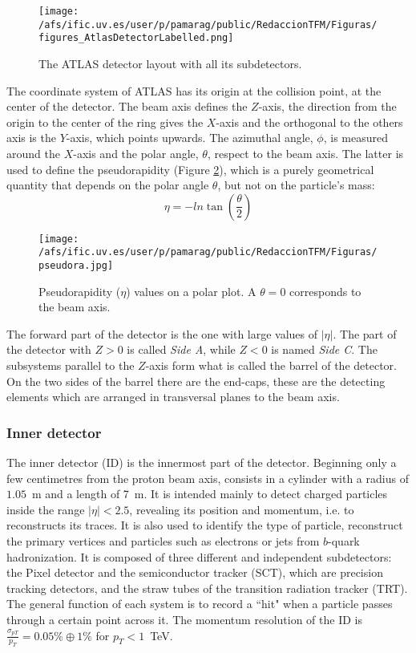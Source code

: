 \begin{figure}[htb]
\centering
\texttt{[image: /afs/ific.uv.es/user/p/pamarag/public/RedaccionTFM/Figuras/figures\_AtlasDetectorLabelled.png]}
\caption{The ATLAS detector layout with all its subdetectors.}
\label{Fig:ATLAS}
\end{figure}

The coordinate system of ATLAS has its origin at the collision point, at the center of the detector. The beam axis defines the $Z$-axis, the direction from the origin to the center of the ring gives the $X$-axis and the orthogonal to the others axis is the $Y$-axis, which points upwards. The azimuthal angle, $\phi$, is measured around the $X$-axis and the polar angle, $\theta$, respect to the beam axis. The latter is used to define the pseudorapidity (Figure \ref{Fig:Pseudorapidity}), which is a purely geometrical quantity that depends on the polar angle $\theta$, but not on the particle’s mass:
\begin{equation}
\eta = -ln \tan\left(\frac{\theta}{2}\right)
\end{equation}

\begin{figure}[htb]
\centering
\texttt{[image: /afs/ific.uv.es/user/p/pamarag/public/RedaccionTFM/Figuras/pseudora.jpg]}
\caption{Pseudorapidity ($\eta$) values on a polar plot. A $\theta=0$ corresponds to the beam axis.}
\label{Fig:Pseudorapidity}
\end{figure}

The forward part of the detector is the one with large values of $|\eta|$. The part of the detector with $Z>0$ is called \textit{Side A}, while $Z<0$ is named \textit{Side C}. The subsystems parallel to the $Z$-axis form what is called the barrel of the detector. On the two sides of the barrel there are the end-caps, these are the detecting elements which are arranged in transversal planes to the beam axis.

\subsubsection*{Inner detector}
The inner detector (ID) is the innermost part of the detector. Beginning only a few centimetres from the proton beam axis, consists in a cylinder with a radius of $1.05$~m and a length of 7~m. It is intended mainly to detect charged particles inside the range $|\eta|<2.5$, revealing its position and momentum, i.e. to reconstructs its traces. It is also used to identify the type of particle, reconstruct the primary vertices and particles such as electrons or jets from $b$-quark hadronization. 
It is composed of three different and independent subdetectors: the Pixel detector and the semiconductor tracker (SCT), which are precision tracking detectors, and the straw tubes of the transition radiation tracker (TRT). The general function of each system is to record a ``hit" when a particle passes through a certain point across it. The momentum resolution of the ID is $\frac{\sigma_{pT}}{p_T}=0.05 \% \oplus 1 \%$ for $p_T <1$~TeV.

